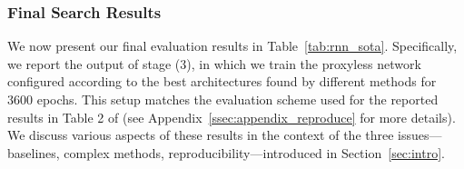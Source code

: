 \documentclass[acmlarge, nonacm]{acmart}
\begin{document}
\subsubsection{Final Search Results}

We now present our final evaluation results in Table~\ref{tab:rnn_sota}.  Specifically, we report the output of stage (3), in which we train the proxyless network configured according to the best architectures found by different methods for 3600 epochs. This setup matches the evaluation scheme used for the reported results in Table 2 of \citet{liu2018darts} (see Appendix~\ref{ssec:appendix_reproduce} for more details).  
We discuss various aspects of these results in the context of the three issues---baselines, complex methods, reproducibility---introduced in Section~\ref{sec:intro}.
\end{document}

